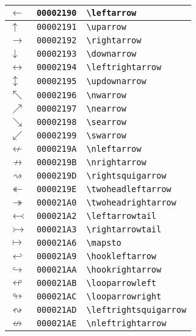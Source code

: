 \begin{longtable}{|l|l|l|}
\hline
$\leftarrow$ & \texttt{00002190} & \verb|\leftarrow| \\
\hline
$\uparrow$ & \texttt{00002191} & \verb|\uparrow| \\
\hline
$\rightarrow$ & \texttt{00002192} & \verb|\rightarrow| \\
\hline
$\downarrow$ & \texttt{00002193} & \verb|\downarrow| \\
\hline
$\leftrightarrow$ & \texttt{00002194} & \verb|\leftrightarrow| \\
\hline
$\updownarrow$ & \texttt{00002195} & \verb|\updownarrow| \\
\hline
$\nwarrow$ & \texttt{00002196} & \verb|\nwarrow| \\
\hline
$\nearrow$ & \texttt{00002197} & \verb|\nearrow| \\
\hline
$\searrow$ & \texttt{00002198} & \verb|\searrow| \\
\hline
$\swarrow$ & \texttt{00002199} & \verb|\swarrow| \\
\hline
$\nleftarrow$ & \texttt{0000219A} & \verb|\nleftarrow| \\
\hline
$\nrightarrow$ & \texttt{0000219B} & \verb|\nrightarrow| \\
\hline
$\rightsquigarrow$ & \texttt{0000219D} & \verb|\rightsquigarrow| \\
\hline
$\twoheadleftarrow$ & \texttt{0000219E} & \verb|\twoheadleftarrow| \\
\hline
$\twoheadrightarrow$ & \texttt{000021A0} & \verb|\twoheadrightarrow| \\
\hline
$\leftarrowtail$ & \texttt{000021A2} & \verb|\leftarrowtail| \\
\hline
$\rightarrowtail$ & \texttt{000021A3} & \verb|\rightarrowtail| \\
\hline
$\mapsto$ & \texttt{000021A6} & \verb|\mapsto| \\
\hline
$\hookleftarrow$ & \texttt{000021A9} & \verb|\hookleftarrow| \\
\hline
$\hookrightarrow$ & \texttt{000021AA} & \verb|\hookrightarrow| \\
\hline
$\looparrowleft$ & \texttt{000021AB} & \verb|\looparrowleft| \\
\hline
$\looparrowright$ & \texttt{000021AC} & \verb|\looparrowright| \\
\hline
$\leftrightsquigarrow$ & \texttt{000021AD} & \verb|\leftrightsquigarrow| \\
\hline
$\nleftrightarrow$ & \texttt{000021AE} & \verb|\nleftrightarrow| \\
\hline

\end{longtable}

